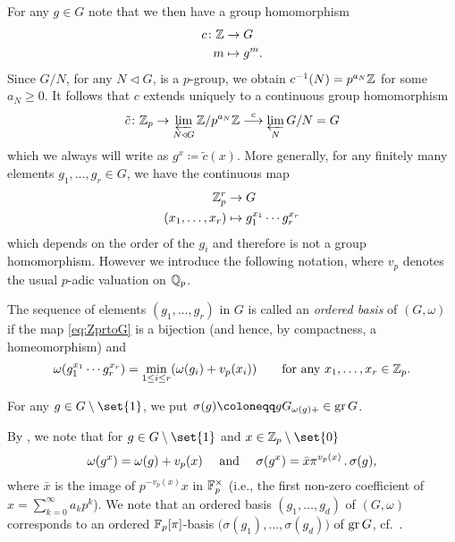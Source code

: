 For any $g\in G$ note that we then have a group homomorphism
\begin{align*}
  c\colon \mathbb{Z} &\to G\\
  m &\mapsto g^m.
\end{align*}
Since $G/N$, for any $N \triangleleft G$, is a $p$-group, we obtain $c^{-1}(N) = p^{a_N}\mathbb{Z}$ for some $a_N\geq0$. It follows that $c$ extends uniquely to a continuous group homomorphism
\begin{equation*}
  \tilde{c} \colon \mathbb{Z}_p \to \varprojlim_{N \triangleleft G} \mathbb{Z}/p^{a_N}\mathbb{Z} \overset{c}{\longrightarrow} \varprojlim_N G/N = G
\end{equation*}
which we always will write as $g^x \coloneqq \tilde{c}(x)$. More generally, for any finitely many elements $g_1,\dotsc,g_r\in G$, we have the continuous map
\begin{equation}\label{eq:ZprtoG}
  \begin{aligned}
    \mathbb{Z}_p^r &\to G \\
    (x_1,\dotsc,x_r) &\mapsto g_1^{x_1}\dotsb g_r^{x_r}
  \end{aligned}
\end{equation}
which depends on the order of the $g_i$ and therefore is not a group homomorphism. However we introduce the following notation, where $v_{p}$ denotes the usual $p$-adic valuation on $\mathbb{Q}_p$.
\begin{definition}
  The sequence of elements $(g_1,\dotsc,g_r)$ in $G$ is called an \emph{ordered basis} of $(G,\omega)$ if the map \eqref{eq:ZprtoG} is a bijection (and hence, by compactness, a homeomorphism) and
  \begin{equation*}
    \omega(g_1^{x_1}\dotsb g_r^{x_r}) = \min_{1 \leq i \leq r}(\omega(g_i)+v_{p}(x_i)) \qquad \text{for any } x_1,\dotsc,x_r\in\mathbb{Z}_p.
  \end{equation*}
\end{definition}

\begin{definition}
  For any $g \in G \setminus \set{1}$, we put $\sigma(g) \coloneqq gG_{\omega(g)+} \in \gr G$.
\end{definition}

By \cite[Remark~26.3]{Sch}, we note that for $g \in G \setminus \set{1}$ and $x \in \Z_{p} \setminus \set{0}$
\begin{equation}
  \label{eq:sigma-gx}
  \omega(g^{x}) = \omega(g) + v_{p}(x) \quad \text{ and } \quad \sigma(g^{x}) = \bar{x}\pi^{v_{p}(x)} \,.\, \sigma(g),
\end{equation}
where $\bar{x}$ is the image of $p^{-v_{p}(x)}x$ in $\mathbb{F}_{p}^{\times}$ (i.e., the first non-zero coefficient of $x = \sum_{k=0}^{\infty} a_{k}p^{k}$). We note that an ordered basis $(g_{1},\dotsc,g_{d})$ of $(G,\omega)$ corresponds to an ordered $\mathbb{F}_{p}[\pi]$-basis $\bigl( \sigma(g_{1}), \dotsc, \sigma(g_{d}) \bigr)$ of $\operatorname{gr} G$, cf.\ \cite[Prop.~26.5]{Sch}.

